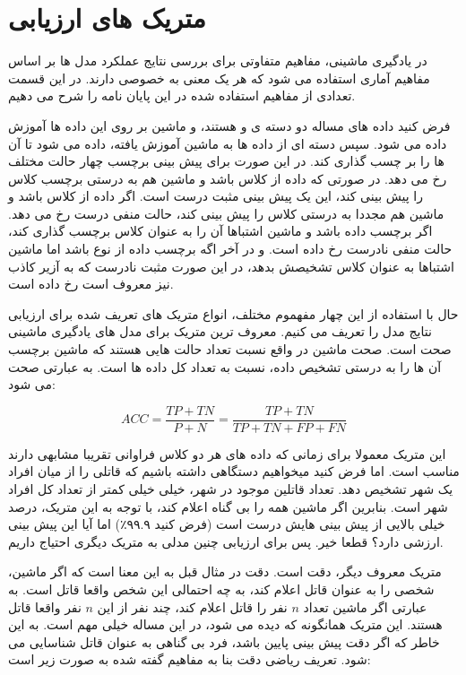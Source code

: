 \section{متریک های ارزیابی}

در یادگیری ماشینی، مفاهیم متفاوتی برای بررسی نتایج عملکرد مدل ها بر اساس مفاهیم آماری استفاده می شود که هر یک معنی به خصوصی دارند. در این قسمت تعدادی از مفاهیم استفاده شده در این پایان نامه را شرح می دهیم.

فرض کنید داده های مساله دو دسته ی
و
هستند، و ماشین بر روی این داده ها آموزش داده می شود.
سپس دسته ای از داده ها به ماشین آموزش یافته، داده می شود تا آن ها را بر چسب گذاری کند.
در این صورت برای پیش بینی برچسب
چهار حالت مختلف رخ می دهد.
در صورتی که داده از کلاس
باشد و ماشین هم به درستی برچسب کلاس
را پیش بینی کند، این یک پیش بینی مثبت درست
است.
اگر داده از کلاس
باشد و ماشین هم مجددا به درستی کلاس
را پیش بینی کند، حالت منفی درست
رخ می دهد.
اگر برچسب داده
باشد و ماشین اشتباها آن را به عنوان کلاس
برچسب گذاری کند، حالت منفی نادرست
رخ داده است.
و در آخر اگه برچسب داده از نوع
باشد اما ماشین اشتباها به عنوان کلاس
تشخیصش بدهد، در این صورت مثبت نادرست
که به آزیر کاذب نیز معروف است رخ داده است.

حال با استفاده از این چهار مفهموم مختلف، انواع متریک های تعریف شده برای ارزیابی نتایج مدل را تعریف می کنیم. معروف ترین متریک برای مدل های یادگیری ماشینی صحت
است. صحت ماشین در واقع نسبت تعداد حالت هایی هستند که ماشین برچسب آن ها را به درستی تشخیص داده، نسبت به تعداد کل داده ها است. به عبارتی صحت می شود:

\begin{equation}\label{eqn:acc}
ACC = \frac{TP+TN}{P+N} = \frac{TP+TN}{TP+TN+FP+FN}
\end{equation}

این متریک معمولا برای زمانی که داده های هر دو کلاس فراوانی تقریبا مشابهی دارند مناسب است. اما فرض کنید میخواهیم دستگاهی داشته باشیم که قاتلی را از میان افراد یک شهر تشخیص دهد. تعداد قاتلین موجود در شهر، خیلی خیلی کمتر از تعداد کل افراد شهر است. بنابرین اگر ماشین همه را بی گناه اعلام کند، با توجه به این متریک، درصد خیلی بالایی از پیش بینی هایش درست است‌ (فرض کنید ۹۹.۹٪)
اما آیا این پیش بینی ارزشی دارد؟ قطعا خیر. پس برای ارزیابی چنین مدلی به متریک دیگری احتیاج داریم.

متریک معروف دیگر، دقت
است. دقت در مثال قبل به این معنا است که اگر ماشین، شخصی را به عنوان قاتل اعلام کند، به چه احتمالی این شخص واقعا قاتل است. به عبارتی اگر ماشین تعداد
$n$
نفر را قاتل اعلام کند، چند نفر از این
$n$
نفر واقعا قاتل هستند. این متریک همانگونه که دیده می شود، در این مساله خیلی مهم است. به این خاطر که اگر دقت پیش بینی پایین باشد، فرد بی گناهی به عنوان قاتل شناسایی می شود. تعریف ریاضی دقت بنا به مفاهیم گفته شده به صورت زیر است:

